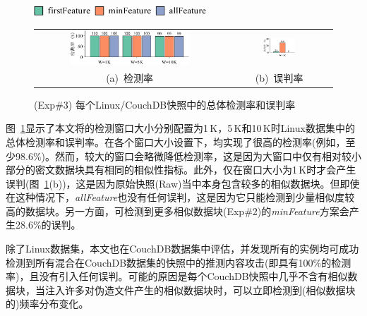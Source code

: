 \begin{figure}[!htb]
  \centering
  \includegraphics[height=10.5pt]{pic/featurespy/plot/detection/overall/effectiveness-falsePositive_legend.pdf}
  \vspace{5pt}\\
  \begin{tabular}{@{\ }c@{\ }c}
    \includegraphics[width=0.66\textwidth]{pic/featurespy/plot/detection/overall/effectivenessLinux.pdf} &
    \includegraphics[width=0.33\textwidth]{pic/featurespy/plot/detection/overall/falsePositiveLinux.pdf}   \\
    \mbox{\small (a) 检测率}                                                                             &
    \mbox{\small (b) 误判率}                                                                               \\
  \end{tabular}
  \caption{(Exp\#3) 每个Linux/CouchDB快照中的总体检测率和误判率}
  \label{fig:featurespy-expDetectionOverallFalsePositive}
\end{figure}

图~\ref{fig:featurespy-expDetectionOverallFalsePositive}显示了本文将\sysnameF 的检测窗口大小分别配置为1\,K，5\,K和10\,K时Linux数据集中的总体检测率和误判率。在各个窗口大小设置下，\sysnameF 均实现了很高的检测率(例如，至少98.6\%)。然而，较大的窗口会略微降低检测率，这是因为大窗口中仅有相对较小部分的密文数据块具有相同的相似性指标。此外，\sysnameF 仅在窗口大小为1\,K时才会产生误判(图~\ref{fig:featurespy-expDetectionOverallFalsePositive}(b))，这是因为原始快照(Raw)当中本身包含较多的相似数据块。但即使在这种情况下，\textit{allFeature}也没有任何误判，这是因为它只能检测到少量相似度较高的数据块。另一方面，可检测到更多相似数据块(Exp\#2)的\textit{minFeature}方案会产生28.6\%的误判。

除了Linux数据集，本文也在CouchDB数据集中评估\sysnameF，并发现所有\sysnameF 的实例均可成功检测到所有混合在CouchDB数据集的快照中的推测内容攻击(即具有100\%的检测率)，且没有引入任何误判。可能的原因是每个CouchDB快照中几乎不含有相似数据块，当注入许多对伪造文件产生的相似数据块时，\sysnameF 可以立即检测到(相似数据块的)频率分布变化。

